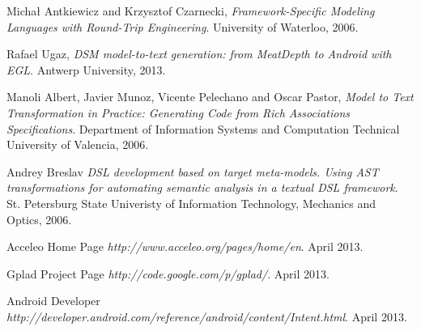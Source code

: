 \begin{thebibliography}{9}

  Michał Antkiewicz and Krzysztof Czarnecki,
  \emph{Framework-Specific Modeling Languages with Round-Trip Engineering}.
  University of Waterloo,
  2006.
  
  Rafael Ugaz,
  \emph{DSM model-to-text generation: from MeatDepth to Android with EGL}.
  Antwerp University,
  2013.
 
  Manoli Albert, Javier Munoz, Vicente Pelechano and Oscar Pastor,
  \emph{Model to Text Transformation in Practice: Generating Code from Rich Associations Specifications}.
  Department of Information Systems and Computation Technical University of Valencia,
  2006.  
  
  Andrey Breslav
  \emph{DSL development based on target meta-models. Using AST transformations for automating semantic analysis in a textual DSL framework}.
  St. Petersburg State Univeristy of Information Technology, Mechanics and Optics,
  2006. 

  Acceleo Home Page
  \emph{http://www.acceleo.org/pages/home/en}.
  April 2013. 
  
  Gplad Project Page
  \emph{http://code.google.com/p/gplad/}.
  April 2013. 

  Android Developer
  \emph{http://developer.android.com/reference/android/content/Intent.html}.
  April 2013. 
     
\end{thebibliography}